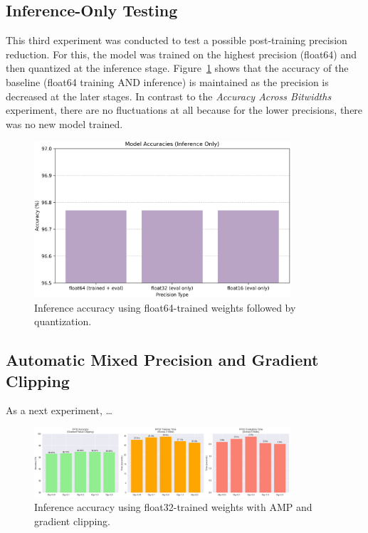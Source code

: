 \documentclass[11pt]{article}
\begin{document}
\subsection*{Inference-Only Testing}
This third experiment was conducted to test a possible post-training precision
reduction. For this, the model was trained on the highest precision (float64)
and then quantized at the inference stage.
Figure~\ref{fig:inferenceOnlyTesting} shows that the accuracy of the baseline
(float64 training AND inference) is maintained as the precision is decreased at
the later stages. In contrast to the \textit{Accuracy Across Bitwidths}
experiment, there are no fluctuations at all because for the lower precisions,
there was no new model trained.
\begin{figure}[H]
	\centering
	\includegraphics[width=0.85\textwidth]{figures/inferenceOnly.png}
	\caption{Inference accuracy using float64-trained weights followed by quantization.}\label{fig:inferenceOnlyTesting}
\end{figure}

\subsection*{Automatic Mixed Precision and Gradient Clipping}
As a next experiment, \dots %
\begin{figure}[H]
	\centering
	\includegraphics[width=0.85\textwidth]{figures/gradclip_32.png}
	\caption{Inference accuracy using float32-trained weights with AMP and gradient clipping.}
\end{figure}
\end{document}
